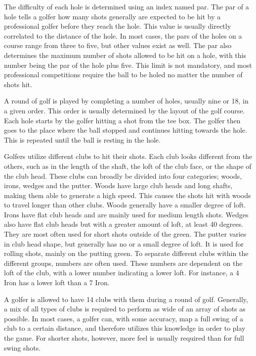 \documentclass{kththesis}
\begin{document}
The difficulty of each hole is determined using an index named par. The par of a hole tells a golfer how many shots generally are expected to be hit by a professional golfer before they reach the hole. This value is usually directly correlated to the distance of the hole. In most cases, the pars of the holes on a course range from three to five, but other values exist as well. The par also determines the maximum number of shots allowed to be hit on a hole, with this number being the par of the hole plus five. This limit is not mandatory, and most professional competitions require the ball to be holed no matter the number of shots hit.

A round of golf is played by completing a number of holes, usually nine or 18, in a given order. This order is usually determined by the layout of the golf course. Each hole starts by the golfer hitting a shot from the tee box. The golfer then goes to the place where the ball stopped and continues hitting towards the hole. This is repeated until the ball is resting in the hole.

Golfers utilize different clubs to hit their shots. Each club looks different from the others, such as in the length of the shaft, the loft of the club face, or the shape of the club head. These clubs can broadly be divided into four categories; woods, irons, wedges and the putter. Woods have large club heads and long shafts, making them able to generate a high speed. This causes the shots hit with woods to travel longer than other clubs. Woods generally have a smaller degree of loft. Irons have flat club heads and are mainly used for medium length shots. Wedges also have flat club heads but with a greater amount of loft, at least 40 degrees. They are most often used for short shots outside of the green. The putter varies in club head shape, but generally has no or a small degree of loft. It is used for rolling shots, mainly on the putting green. To separate different clubs within the different groups, numbers are often used. These numbers are dependent on the loft of the club, with a lower number indicating a lower loft. For instance, a 4 Iron has a lower loft than a 7 Iron.

A golfer is allowed to have 14 clubs with them during a round of golf. Generally, a mix of all types of clubs is required to perform as wide of an array of shots as possible. In most cases, a golfer can, with some accuracy, map a full swing of a club to a certain distance, and therefore utilizes this knowledge in order to play the game. For shorter shots, however, more feel is usually required than for full swing shots.
\end{document}
